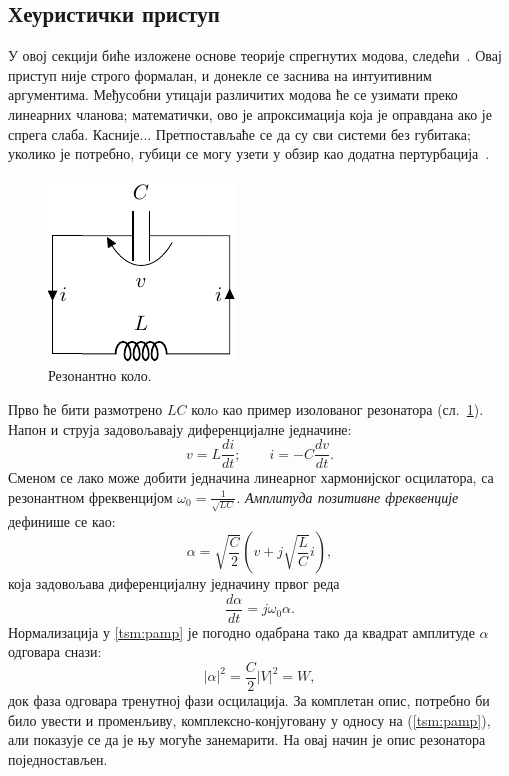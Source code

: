 \subsection{Хеуристички приступ}

У овој секцији биће изложене основе теорије спрегнутих модова, следећи~\cite{haus}. Овај приступ није строго формалан, и донекле се заснива на интуитивним аргументима. Међусобни утицаји различитих модова ће се узимати преко линеарних чланова; математички, ово је апроксимација која је оправдана ако је спрега слаба. Касније... Претпостављаће се да су сви системи без губитака; уколико је потребно, губици се могу узети у обзир као додатна пертурбација~\cite{haus}.

\begin{figure}[h]
\centering
\includegraphics[width=0.4\linewidth]{sl_tsm/lckolo.pdf}
\caption{Резонантно коло.}
\label{tsm:fig:lckolo}
\end{figure}
Прво ће бити размотрено $LC$ колo као пример изолованог резонатора (сл.~\ref{tsm:fig:lckolo}). Напон и струја задовољавају диференцијалне једначине:
\begin{equation}
v = L \frac{d i}{d t}; \qquad i = -C \frac{d v}{d t}.
\end{equation}
Сменом се лако може добити једначина линеарног хармонијског осцилатора, са резонантном фреквенцијом $\omega_0 = \frac{1}{\sqrt{LC}}$. \emph{Амплитуда позитивне фреквенције} дефинише се као:
\begin{equation}
\alpha = \sqrt{\frac{C}{2}}\left( v + j\sqrt{\frac{L}{C}}i  \right),
\label{tsm:pamp}
\end{equation}
која задовољава диференцијалну једначину првог реда
\begin{equation}
\frac{d\alpha}{dt} = j\omega_0 \alpha.
\label{tsm:smdif1}
\end{equation}
Нормализација у \ref{tsm:pamp} је погодно одабрана тако да квадрат амплитуде $\alpha$ одговара снази:
\begin{equation}
|\alpha|^2 = \frac{C}{2}|V|^2 = W,
\end{equation}
док фаза одговара тренутној фази осцилација. За комплетан опис, потребно би било увести и променљиву, комплексно-конјуговану у односу на (\ref{tsm:pamp}), али показује се да је њу могуће занемарити. На овај начин је опис резонатора поједностављен.

